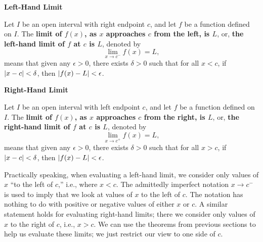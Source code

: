 \begin{definition}\label{def:onesidedlimit}%
\textbf{Left-Hand Limit} 

Let $I$ be an open interval with right endpoint $c$, and let $f$ be a function defined on $I$. %
The \textbf{limit of $f(x)$, as $x$ approaches $c$ from the left, is $L$}, or, \textbf{the left-hand limit of $f$ at $c$ is $L$}, denoted by  
\[\lim_{x\rightarrow c^-} f(x) = L,\]
means that given any $\epsilon > 0$, there exists $\delta > 0$ such that for all $x< c$,  
if  $\left\lvert x-c \right\rvert<\delta$, then $\left\lvert f(x)-L \right\rvert<\epsilon$.\bigskip

\textbf{Right-Hand Limit}

Let $I$ be an open interval with left endpoint $c$, and let $f$ be a function defined on $I$. %
The \textbf{limit of $f(x)$, as $x$ approaches $c$ from the right, is $L$}, or, \textbf{the right-hand limit of $f$ at $c$ is $L$}, denoted by  
\[\lim_{x\rightarrow c^+} f(x) = L,\]
means that given any $\epsilon > 0$, there exists $\delta > 0$ such that for all $x> c$,  
if  $\left\lvert x-c \right\rvert<\delta$, then $\left\lvert f(x)-L \right\rvert<\epsilon$.
\end{definition}

Practically speaking, when evaluating a left-hand limit, we consider only values of $x$ ``to the left of $c$,'' i.e., where $x<c$. The admittedly imperfect notation $x\to c^-$ is used to imply that we look at values of $x$ to the left of $c$. The notation has nothing to do with positive or negative values of either $x$ or $c$. A similar statement holds for evaluating right-hand limits; there we consider only values of $x$ to the right of $c$, i.e., $x>c$. We can use the theorems from previous sections to help us evaluate these limits; we just restrict our view to one side of $c$.

